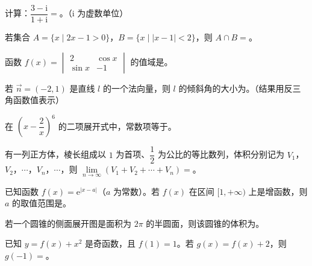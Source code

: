 

\begin{question}
计算：$\dfrac{3-\mathrm i}{1+\mathrm i}=$\gkblank{}。（$\mathrm i$ 为虚数单位）

\end{question}
\begin{question}
若集合 $A=\{x\mid2x-1>0\}$，$B=\{x\mid|x-1|<2\}$，则 $A\cap B=$\gkblank{}。

\end{question}
\begin{question}
函数 $f(x)=\begin{vmatrix}2&\cos x\\ \sin x&-1\end{vmatrix}$ 的值域是\gkblank{}。

\end{question}
\begin{question}
若 $\overrightarrow n=(-2,1)$ 是直线 $l$ 的一个法向量，则 $l$ 的倾斜角的大小为\gkblank{}。（结果用反三角函数值表示）

\end{question}
\begin{question}
在 $\left(x-\dfrac2x\right)^6$ 的二项展开式中，常数项等于\gkblank{}。

\end{question}
\begin{question}
有一列正方体，棱长组成以 $1$ 为首项、$\dfrac12$ 为公比的等比数列，体积分别记为 $V_1$，$V_2$，$\cdots$，$V_n$，$\cdots$，则 $\lim\limits_{n\to\infty}(V_1+V_2+\cdots+V_n)=$\gkblank{}。

\end{question}
\begin{question}
已知函数 $f(x)=\mathrm e^{|x-a|}$（$a$ 为常数）。若 $f(x)$ 在区间 $[1,+\infty)$ 上是增函数，则 $a$ 的取值范围是\gkblank{}。

\end{question}
\begin{question}
若一个圆锥的侧面展开图是面积为 $2\pi$ 的半圆面，则该圆锥的体积为\gkblank{}。

\end{question}
\begin{question}
已知 $y=f(x)+x^2$ 是奇函数，且 $f(1)=1$。若 $g(x)=f(x)+2$，则 $g(-1)=$\gkblank{}。

\Needspace{0.4\textheight}
\end{question}
